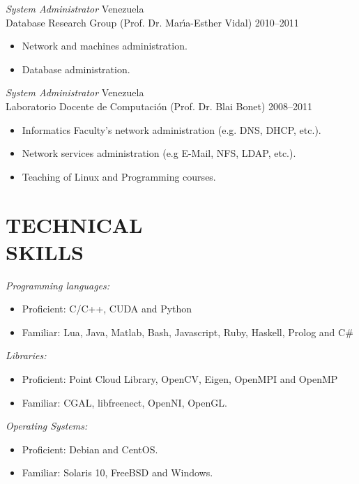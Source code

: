 \documentclass[margin, 10pt]{res} %
\begin{document}
\begin{resume}
{{\sl System Administrator} \hfill Venezuela}\\
{Database Research Group (Prof. Dr. Mar\'{\i}a-Esther Vidal) \hfill 2010--2011}\\
\begin{itemize} 
\item Network and machines administration.
\item Database administration.
\end{itemize} 

{{\sl System Administrator} \hfill Venezuela}\\
{Laboratorio Docente de Computaci\'{o}n (Prof. Dr. Blai Bonet) \hfill 2008--2011}\\
\begin{itemize} 
\item Informatics Faculty's network administration (e.g. DNS, DHCP, etc.).
\item Network services administration (e.g E-Mail, NFS, LDAP, etc.).
\item Teaching of Linux and Programming courses.
\end{itemize} 



\section{TECHNICAL \\ SKILLS} 

{\sl Programming languages:} \\
\begin{itemize} 
\item Proficient: C/C++, CUDA and Python
\item Familiar: Lua, Java, Matlab, Bash, Javascript, Ruby, Haskell, Prolog and 
  C\#
\end{itemize} 

{\sl Libraries:} \\
\begin{itemize} 
\item Proficient: Point Cloud Library, OpenCV, Eigen, OpenMPI and OpenMP
\item Familiar: CGAL, libfreenect, OpenNI, OpenGL.
\end{itemize} 

{\sl Operating Systems:} \\
\begin{itemize} 
\item Proficient: Debian and CentOS.
\item Familiar: Solaris 10, FreeBSD and Windows.
\end{itemize} 
 

\end{resume}
\end{document}
